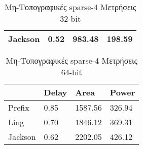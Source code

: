 \begin{multicols}{2}
\begin{table}[H]
\begin{tabular}{||p{1.2cm} | p{0.7cm} p{1cm} p{1cm} ||}
        Jackson & 0.52  & 983.48    & 198.59 \\
        \hline
    \end{tabular}
\caption{Μη-Τοπογραφικές sparse-4 Μετρήσεις 32-bit}
\label{topo_sparse4_result_table_32}
\end{table}
\begin{table}[H]
\centering
     \begin{tabular}{||p{1.2cm} | p{0.7cm} p{1cm} p{1cm} ||} 
        \hline
         & Delay & Area & Power \\ [0.5ex] 
        \hline\hline
        Prefix  & 0.85  & 1587.56    & 326.94 \\ 
        \hline
        Ling    & 0.70  & 1846.12    & 369.31 \\
        \hline
        Jackson & 0.62  & 2202.05    & 426.12 \\
        \hline
    \end{tabular}
\caption{Μη-Τοπογραφικές sparse-4 Μετρήσεις 64-bit}
\label{topo_sparse4_result_table_64}
\end{table}
\end{multicols}















